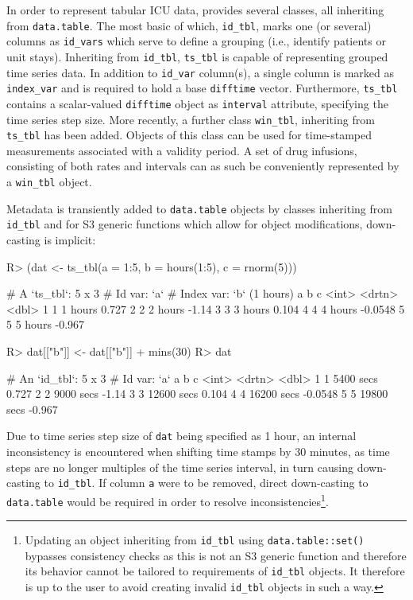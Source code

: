 \documentclass[
  notitle]{jss}
\begin{document}
In order to represent tabular ICU data,  provides several
classes, all inheriting from \texttt{data.table}. The most basic of
which, \texttt{id\_tbl}, marks one (or several) columns as
\texttt{id\_vars} which serve to define a grouping (i.e., identify
patients or unit stays). Inheriting from \texttt{id\_tbl},
\texttt{ts\_tbl} is capable of representing grouped time series data. In
addition to \texttt{id\_var} column(s), a single column is marked as
\texttt{index\_var} and is required to hold a base 
\texttt{difftime} vector. Furthermore, \texttt{ts\_tbl} contains a
scalar-valued \texttt{difftime} object as \texttt{interval} attribute,
specifying the time series step size. More recently, a further class
\texttt{win\_tbl}, inheriting from \texttt{ts\_tbl} has been added.
Objects of this class can be used for time-stamped measurements
associated with a validity period. A set of drug infusions, consisting
of both rates and intervals can as such be conveniently represented by a
\texttt{win\_tbl} object.

Metadata is transiently added to \texttt{data.table} objects by classes
inheriting from \texttt{id\_tbl} and for S3 generic functions which
allow for object modifications, down-casting is implicit:

\begin{CodeChunk}
\begin{CodeInput}
R> (dat <- ts_tbl(a = 1:5, b = hours(1:5), c = rnorm(5)))
\end{CodeInput}
\begin{CodeOutput}
# A `ts_tbl`: 5 x 3
# Id var:     `a`
# Index var:  `b` (1 hours)
      a b             c
  <int> <drtn>    <dbl>
1     1 1 hours  0.727
2     2 2 hours -1.14
3     3 3 hours  0.104
4     4 4 hours -0.0548
5     5 5 hours -0.967
\end{CodeOutput}
\begin{CodeInput}
R> dat[["b"]] <- dat[["b"]] + mins(30)
R> dat
\end{CodeInput}
\begin{CodeOutput}
# An `id_tbl`: 5 x 3
# Id var:      `a`
      a b                c
  <int> <drtn>       <dbl>
1     1  5400 secs  0.727
2     2  9000 secs -1.14
3     3 12600 secs  0.104
4     4 16200 secs -0.0548
5     5 19800 secs -0.967
\end{CodeOutput}
\end{CodeChunk}

Due to time series step size of \texttt{dat} being specified as 1 hour,
an internal inconsistency is encountered when shifting time stamps by 30
minutes, as time steps are no longer multiples of the time series
interval, in turn causing down-casting to \texttt{id\_tbl}. If column
\texttt{a} were to be removed, direct down-casting to
\texttt{data.table} would be required in order to resolve
inconsistencies\footnote{Updating an object inheriting from
  \texttt{id\_tbl} using \texttt{data.table::set()} bypasses consistency
  checks as this is not an S3 generic function and therefore its
  behavior cannot be tailored to requirements of \texttt{id\_tbl}
  objects. It therefore is up to the user to avoid creating invalid
  \texttt{id\_tbl} objects in such a way.}.
\end{document}
